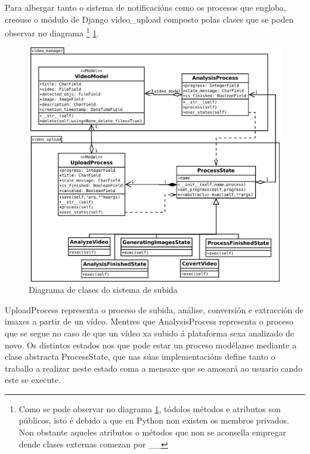         Para albergar tanto o sistema de notificacións como os procesos que engloba, creouse o módulo de 
        Django video\_upload composto polas clases que se poden observar no diagrama 
        \footnote{Como se pode observar no diagrama \ref{fig:ClassDiagram},
        tódolos métodos e atributos son públicos, isto é debido a que en Python non existen os 
        membros privados. Non obstante aqueles atributos o métodos que non se aconsella empregar
        dende clases externas comezan por \_\_} \ref{fig:ClassDiagram}.

        \begin{figure}[htp]
        \begin{center}
            \includegraphics[scale=0.4]{figures/ClassDiagram.pdf}
            \caption{Diagrama de clases do sistema de subida}
        \label{fig:ClassDiagram}
        \end{center}
        \end{figure}
        
        UploadProcess representa o proceso de subida, análise, conversión e extracción de imaxes
        a partir de un vídeo. Mentres que AnalysisProcess representa o proceso que se segue no 
        caso de que un vídeo xa subido á plataforma sexa analizado de novo. Os distintos estados
        nos que pode estar un proceso modélanse mediante a clase abstracta ProcessState, que nas
        súas implementacións define tanto o traballo a realizar neste estado coma a mensaxe que 
        se amosará ao usuario cando este se execute.\\
        
